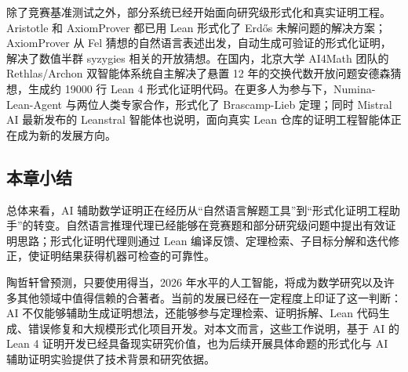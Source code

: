 除了竞赛基准测试之外，部分系统已经开始面向研究级形式化和真实证明工程。Aristotle 和 AxiomProver 都已用 Lean 形式化了 Erdős 未解问题的解决方案；AxiomProver 从 Fel 猜想的自然语言表述出发，自动生成可验证的形式化证明，解决了数值半群 syzygies 相关的开放猜想\cite{Chen2026FelConjecture}。在国内，北京大学 AI4Math 团队的 Rethlas/Archon 双智能体系统自主解决了悬置 12 年的交换代数开放问题安德森猜想，生成约 19000 行 Lean 4 形式化证明代码\cite{Ju2026Rethlas}。在更多人为参与下，Numina-Lean-Agent 与两位人类专家合作，形式化了 Brascamp-Lieb 定理\cite{Liu2026NuminaLeanAgent}；同时 Mistral AI 最新发布的 Leanstral 智能体也说明，面向真实 Lean 仓库的证明工程智能体正在成为新的发展方向\cite{Mistral2026LeanstralNews,Mistral2026LeanstralDocs}。

\subsection{本章小结}

总体来看，AI 辅助数学证明正在经历从“自然语言解题工具”到“形式化证明工程助手”的转变。自然语言推理代理已经能够在竞赛题和部分研究级问题中提出有效证明思路；形式化证明代理则通过 Lean 编译反馈、定理检索、子目标分解和迭代修正，使证明结果获得机器可检查的可靠性。

陶哲轩曾预测，只要使用得当，2026 年水平的人工智能，将成为数学研究以及许多其他领域中值得信赖的合著者\cite{Tao2023AIAnthology}。当前的发展已经在一定程度上印证了这一判断：AI 不仅能够辅助生成证明想法，还能够参与定理检索、证明拆解、Lean 代码生成、错误修复和大规模形式化项目开发。对本文而言，这些工作说明，基于 AI 的 Lean 4 证明开发已经具备现实研究价值，也为后续开展具体命题的形式化与 AI 辅助证明实验提供了技术背景和研究依据。
